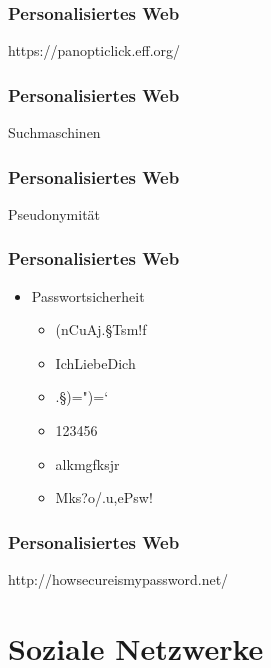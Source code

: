 \documentclass[12pt]{beamer}
\begin{document}
\begin{frame}
  \frametitle{Personalisiertes Web}
  \begin{center} \Large
    https://panopticlick.eff.org/
  \end{center}
\end{frame}

\begin{frame}
  \frametitle{Personalisiertes Web}
  \begin{center} \Large
    Suchmaschinen
  \end{center}
\end{frame}

\begin{frame}
  \frametitle{Personalisiertes Web}
  \begin{center} \Large
     Pseudonymität
  \end{center}
\end{frame}

\begin{frame}
  \frametitle{Personalisiertes Web}
  \begin{itemize}
    \item Passwortsicherheit 
      \begin{itemize}
        \item (nCuAj.§Tsm!f
        \item IchLiebeDich
        \item .§)=")=`
        \item 123456
        \item alkmgfksjr
        \item Mks?o/.u,ePsw!
      \end{itemize}
  \end{itemize}
\end{frame}

\begin{frame}
  \frametitle{Personalisiertes Web}
  \begin{center} \Large
     http://howsecureismypassword.net/
  \end{center}
\end{frame}

\section{Soziale Netzwerke}
\end{document}
